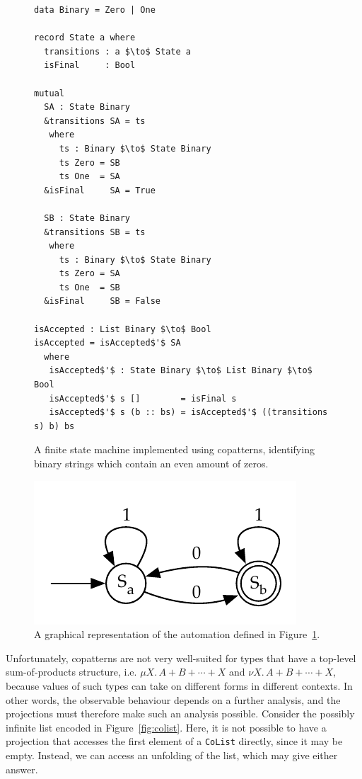 \begin{figure}[h]
\begin{lstlisting}[mathescape]
data Binary = Zero | One

record State a where
  transitions : a $\to$ State a 
  isFinal     : Bool

mutual  
  SA : State Binary
  &transitions SA = ts
   where
     ts : Binary $\to$ State Binary
     ts Zero = SB
     ts One  = SA
  &isFinal     SA = True 
  
  SB : State Binary
  &transitions SB = ts
   where
     ts : Binary $\to$ State Binary
     ts Zero = SA 
     ts One  = SB
  &isFinal     SB = False

isAccepted : List Binary $\to$ Bool
isAccepted = isAccepted$'$ SA
  where
   isAccepted$'$ : State Binary $\to$ List Binary $\to$ Bool
   isAccepted$'$ s []        = isFinal s
   isAccepted$'$ s (b :: bs) = isAccepted$'$ ((transitions s) b) bs
\end{lstlisting}
  \caption{A finite state machine implemented using copatterns, identifying
    binary strings which contain an even amount of zeros.}
\label{fig:state_machine}
\end{figure}

\begin{figure}[h]
\centering
\includegraphics{figures/dfa}
\caption{A graphical representation of the automation defined in
  Figure~\ref{fig:state_machine}.}
\label{fig:state_machine_graphical}
\end{figure}

Unfortunately, copatterns are not very well-suited for types that have a top-level
sum-of-products structure, i.e. ${\mu X.\,A + B + \cdots + X}$ and
${\nu X.\,A + B + \cdots + X}$, because values of such types can take on
different forms in different contexts. In other words, the observable behaviour
depends on a further analysis, and the projections must therefore make
such an analysis possible. Consider the possibly infinite list encoded in
Figure~\ref{fig:colist}. Here, it is not possible to have a projection that
accesses the first element of a \texttt{CoList} directly, since it may be
empty. Instead, we can access an unfolding of the list, which may give either
answer.

